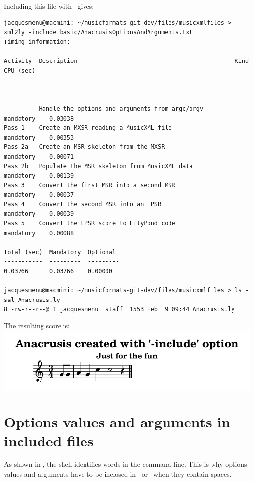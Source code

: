 Including this file with \xmlToLy\ gives:
\begin{lstlisting}[language=Terminal]
jacquesmenu@macmini: ~/musicformats-git-dev/files/musicxmlfiles > xml2ly -include basic/AnacrusisOptionsAndArguments.txt
Timing information:

Activity  Description                                             Kind       CPU (sec)
--------  ------------------------------------------------------  ---------  ---------

          Handle the options and arguments from argc/argv         mandatory    0.03038
Pass 1    Create an MXSR reading a MusicXML file                  mandatory    0.00353
Pass 2a   Create an MSR skeleton from the MXSR                    mandatory    0.00071
Pass 2b   Populate the MSR skeleton from MusicXML data            mandatory    0.00139
Pass 3    Convert the first MSR into a second MSR                 mandatory    0.00037
Pass 4    Convert the second MSR into an LPSR                     mandatory    0.00039
Pass 5    Convert the LPSR score to LilyPond code                 mandatory    0.00088

Total (sec)  Mandatory  Optional
-----------  ---------  ---------
0.03766      0.03766    0.00000

jacquesmenu@macmini: ~/musicformats-git-dev/files/musicxmlfiles > ls -sal Anacrusis.ly
8 -rw-r--r--@ 1 jacquesmenu  staff  1553 Feb  9 09:44 Anacrusis.ly
\end{lstlisting}

The resulting score is:\\
\includegraphics[scale=0.7]{../graphics/AnacrusisWithInclude.png}


\section{Options values and arguments in included files}

As shown in , the shell identifies words in the command line. This is why options values and arguments have to be inclosed in \quotes\ or \doubleQuotes\ when they contain spaces.

